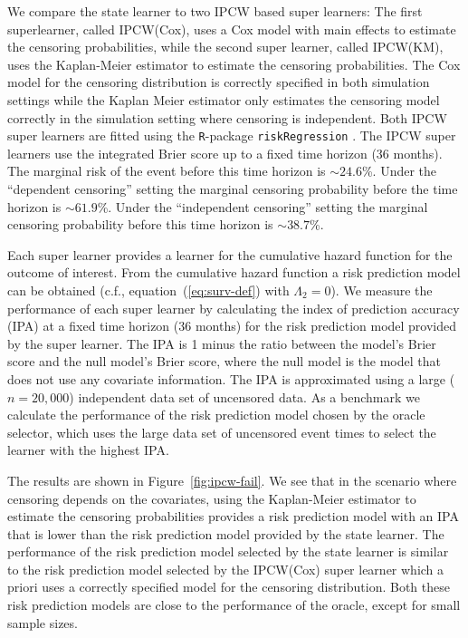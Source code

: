 \documentclass[unnumsec,webpdf,contemporary,large,namedate]{oup-authoring-template}%
\theoremstyle{thmstyleone}%
\theoremstyle{thmstyletwo}%
\theoremstyle{thmstylethree}%
\newcommand{\1}{\mathds{1}}
\begin{document}
We compare the state learner to two IPCW based super learners: The
first superlearner, called IPCW(Cox), uses a Cox model with main
effects to estimate the censoring probabilities, while the second
super learner, called IPCW(KM), uses the Kaplan-Meier estimator to
estimate the censoring probabilities. The Cox model for the censoring
distribution is correctly specified in both simulation settings while
the Kaplan Meier estimator only estimates the censoring model
correctly in the simulation setting where censoring is
independent. Both IPCW super learners are fitted using the
\texttt{R}-package \texttt{riskRegression}
\citep{Gerds_Ohlendorff_Ozenne_2023}.
%
%
The IPCW super learners use the integrated Brier score up to a fixed time
horizon (36 months). The marginal risk of the event before this time horizon is
\(\sim 24.6\)\%. Under the ``dependent censoring'' setting the marginal censoring
probability before the time horizon is \(\sim 61.9\)\%. Under the ``independent
censoring'' setting the marginal censoring probability before this time horizon
is \(\sim 38.7\)\%.

Each super learner provides a learner for the cumulative hazard function for the
outcome of interest. From the cumulative hazard function a risk prediction model
can be obtained (c.f., equation~(\ref{eq:surv-def}) with $\Lambda_2 = 0$). We
measure the performance of each super learner by calculating the index of
prediction accuracy (IPA) \citep{kattan2018index} at a fixed time horizon (36
months) for the risk prediction model provided by the super learner. The IPA is
1 minus the ratio between the model's Brier score and the null model's Brier
score, where the null model is the model that does not use any covariate
information. The IPA is approximated using a large (\( n = 20,000 \))
independent data set of uncensored data. As a benchmark we calculate the
performance of the risk prediction model chosen by the oracle selector, which
uses the large data set of uncensored event times to select the learner with the
highest IPA.

The results are shown in Figure~\ref{fig:ipcw-fail}. We see that in
the scenario where censoring depends on the covariates, using the
Kaplan-Meier estimator to estimate the censoring probabilities
provides a risk prediction model with an IPA that is lower than the
risk prediction model provided by the state learner. The performance
of the risk prediction model selected by the state learner is similar
to the risk prediction model selected by the IPCW(Cox) super learner
which a priori uses a correctly specified model for the censoring
distribution. Both these risk prediction models are close to the
performance of the oracle, except for small sample sizes.
\end{document}
